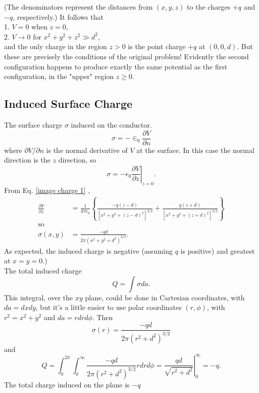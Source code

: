 (The denominators represent the distances from $(x, y, z)$ to the charges $+q$ and $-q$, respectively.) It follows that\\
1. $V=0$ when $z=0$,\\
2. $V \rightarrow 0$ for $x^{2}+y^{2}+z^{2} \gg d^{2}$,\\
and the only charge in the region $z>0$ is the point charge $+q$ at $(0,0, d)$. But these are precisely the conditions of the original problem! Evidently the second configuration happens to produce exactly the same potential as the first configuration, in the "upper" region $z \geq 0 .$
\subsection{Induced Surface Charge}
The surface charge $\sigma$ induced on the conductor.
$$\sigma=-\in_{0}\frac{\partial V}{\partial n}$$
where $\partial V / \partial n$ is the normal derivative of $V$ at the surface. In this case the normal direction is the $z$ direction, so
$$
\sigma=-\left.\epsilon_{0} \frac{\partial V}{\partial z}\right|_{z=0} .
$$
From Eq. \ref{image charge 1} ,
\begin{align*}
\frac{\partial V}{\partial z}&=\frac{1}{4 \pi \epsilon_{0}}\left\{\frac{-q(z-d)}{\left[x^{2}+y^{2}+(z-d)^{2}\right]^{3 / 2}}+\frac{q(z+d)}{\left[x^{2}+y^{2}+(z+d)^{2}\right]^{3 / 2}}\right\}\\
\mathrm{so}\\
\sigma(x, y)&=\frac{-q d}{2 \pi\left(x^{2}+y^{2}+d^{2}\right)^{3 / 2}} .
\end{align*}
As expected, the induced charge is negative (assuming $q$ is positive) and greatest at $x=y=0$.)\\
The total induced charge
$$
Q=\int \sigma d a .
$$
This integral, over the $x y$ plane, could be done in Cartesian coordinates, with $d a=d x d y$, but it's a little easier to use polar coordinates $(r, \phi)$, with $r^{2}=x^{2}+y^{2}$ and $d a=r d r d \phi$. Then
$$
\sigma(r)=\frac{-q d}{2 \pi\left(r^{2}+d^{2}\right)^{3 / 2}}
$$
and
$$
Q=\int_{0}^{2 \pi} \int_{0}^{\infty} \frac{-q d}{2 \pi\left(r^{2}+d^{2}\right)^{3 / 2}} r d r d \phi=\left.\frac{q d}{\sqrt{r^{2}+d^{2}}}\right|_{0} ^{\infty}=-q .
$$
The total charge induced on the plane is $-q$ 
